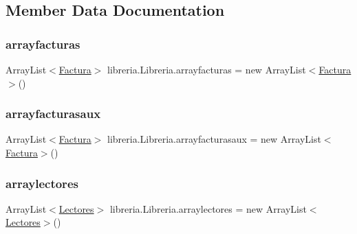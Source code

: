 \subsection{Member Data Documentation}
\mbox{\label{classlibreria_1_1_libreria_a1b6aaea2b6d1d95a7e25b85881e82721}} 
\subsubsection{\texorpdfstring{arrayfacturas}{arrayfacturas}}
{\footnotesize\ttfamily Array\+List$<$\mbox{\hyperlink{classlibreria_1_1_factura}{Factura}}$>$ libreria.\+Libreria.\+arrayfacturas = new Array\+List$<$\mbox{\hyperlink{classlibreria_1_1_factura}{Factura}}$>$()\hspace{0.3cm}{\ttfamily [static]}}

\mbox{\label{classlibreria_1_1_libreria_a29c40164090c7a129f082735a0d15664}} 
\subsubsection{\texorpdfstring{arrayfacturasaux}{arrayfacturasaux}}
{\footnotesize\ttfamily Array\+List$<$\mbox{\hyperlink{classlibreria_1_1_factura}{Factura}}$>$ libreria.\+Libreria.\+arrayfacturasaux = new Array\+List$<$\mbox{\hyperlink{classlibreria_1_1_factura}{Factura}}$>$()\hspace{0.3cm}{\ttfamily [static]}}

\mbox{\label{classlibreria_1_1_libreria_ac9e002dcb370eb6caa314d18cf14a293}} 
\subsubsection{\texorpdfstring{arraylectores}{arraylectores}}
{\footnotesize\ttfamily Array\+List$<$\mbox{\hyperlink{classlibreria_1_1_lectores}{Lectores}}$>$ libreria.\+Libreria.\+arraylectores = new Array\+List$<$\mbox{\hyperlink{classlibreria_1_1_lectores}{Lectores}}$>$()\hspace{0.3cm}{\ttfamily [static]}}

